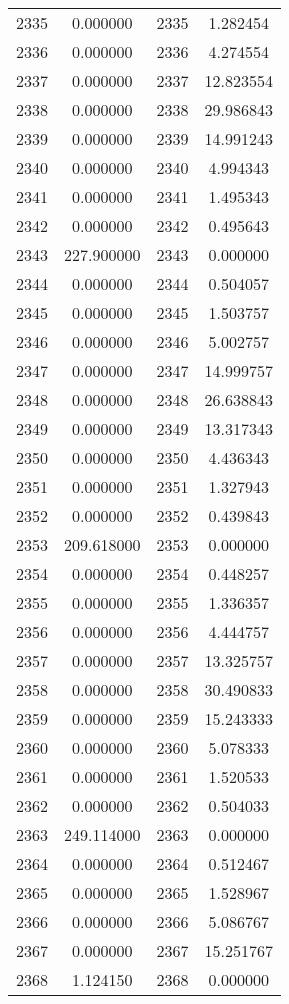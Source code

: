 \documentclass[12pt]{article}
\begin{document}
\begin{longtable}{@{}cccc@{}}
2335 & 0.000000 & 2335 & 1.282454 \\
2336 & 0.000000 & 2336 & 4.274554 \\
2337 & 0.000000 & 2337 & 12.823554 \\
2338 & 0.000000 & 2338 & 29.986843 \\
2339 & 0.000000 & 2339 & 14.991243 \\
2340 & 0.000000 & 2340 & 4.994343 \\
2341 & 0.000000 & 2341 & 1.495343 \\
2342 & 0.000000 & 2342 & 0.495643 \\
2343 & 227.900000 & 2343 & 0.000000 \\
2344 & 0.000000 & 2344 & 0.504057 \\
2345 & 0.000000 & 2345 & 1.503757 \\
2346 & 0.000000 & 2346 & 5.002757 \\
2347 & 0.000000 & 2347 & 14.999757 \\
2348 & 0.000000 & 2348 & 26.638843 \\
2349 & 0.000000 & 2349 & 13.317343 \\
2350 & 0.000000 & 2350 & 4.436343 \\
2351 & 0.000000 & 2351 & 1.327943 \\
2352 & 0.000000 & 2352 & 0.439843 \\
2353 & 209.618000 & 2353 & 0.000000 \\
2354 & 0.000000 & 2354 & 0.448257 \\
2355 & 0.000000 & 2355 & 1.336357 \\
2356 & 0.000000 & 2356 & 4.444757 \\
2357 & 0.000000 & 2357 & 13.325757 \\
2358 & 0.000000 & 2358 & 30.490833 \\
2359 & 0.000000 & 2359 & 15.243333 \\
2360 & 0.000000 & 2360 & 5.078333 \\
2361 & 0.000000 & 2361 & 1.520533 \\
2362 & 0.000000 & 2362 & 0.504033 \\
2363 & 249.114000 & 2363 & 0.000000 \\
2364 & 0.000000 & 2364 & 0.512467 \\
2365 & 0.000000 & 2365 & 1.528967 \\
2366 & 0.000000 & 2366 & 5.086767 \\
2367 & 0.000000 & 2367 & 15.251767 \\
2368 & 1.124150 & 2368 & 0.000000 \\

\end{longtable}
\end{document}
